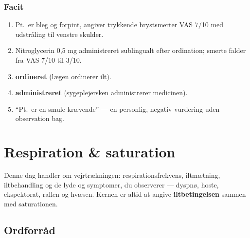 \documentclass[11pt,a4paper]{report}
\begin{document}
\subsection{Facit}
\begin{enumerate}[leftmargin=1.5em,itemsep=5pt]
\item Pt.\ er bleg og forpint, angiver trykkende brystsmerter VAS 7/10 med udstråling til venstre skulder.
\item Nitroglycerin 0,5 mg administreret sublingualt efter ordination; smerte falder fra VAS 7/10 til 3/10.
\item \textbf{ordineret} (lægen ordinerer ilt).
\item \textbf{administreret} (sygeplejersken administrerer medicinen).
\item ``Pt.\ er en smule krævende'' --- en personlig, negativ vurdering uden observation bag.
\end{enumerate}

\chapter{Respiration \& saturation}

Denne dag handler om vejrtrækningen: respirationsfrekvens, iltmætning, iltbehandling og de
lyde og symptomer, du observerer --- dyspnø, hoste, ekspektorat, rallen og hvæsen. Kernen er
altid at angive \textbf{iltbetingelsen} sammen med saturationen.

\section{Ordforråd}
\end{document}

